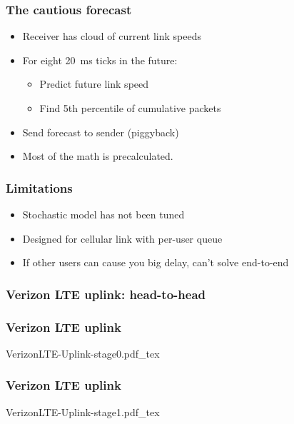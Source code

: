 \documentclass[svgnames]{beamer}
\begin{document}
\begin{frame}
\frametitle{The cautious forecast}

\begin{itemize}

\item Receiver has cloud of current link speeds

\item For eight 20~ms ticks in the future:

\begin{itemize}
\item Predict future link speed

\item Find 5th percentile of cumulative packets
\end{itemize}

\item Send forecast to sender (piggyback)

\item Most of the math is precalculated.

\end{itemize}
\end{frame}

\begin{frame}
\frametitle{Limitations}

\begin{itemize}

\item Stochastic model has not been tuned

\item Designed for cellular link with per-user queue

\item If other users can cause you big delay, can't solve end-to-end

\end{itemize}

\end{frame}

\begin{frame}
\frametitle{Verizon LTE uplink: head-to-head}

\end{frame}

\begin{frame}
\frametitle{Verizon LTE uplink}
\vspace{-1 cm}
\def\svgwidth{\columnwidth}\footnotesize{VerizonLTE-Uplink-stage0.pdf_tex}
\end{frame}

\begin{frame}
\frametitle{Verizon LTE uplink}
\vspace{-1 cm}
\def\svgwidth{\columnwidth}\footnotesize{VerizonLTE-Uplink-stage1.pdf_tex}
\end{frame}
\end{document}
